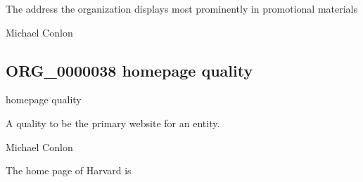 \documentclass[letterpaper,10pt,english]{sphinxmanual}
\begin{document}
\begin{sphinxShadowBox}

\sphinxAtStartPar
The address the organization displays most prominently in promotional materials
\end{sphinxShadowBox}

\begin{sphinxShadowBox}

\sphinxAtStartPar
Michael Conlon 
\end{sphinxShadowBox}
\begin{quote}

\ignorespaces \end{quote}


\subsection{ORG\_0000038 \sphinxhyphen{} homepage quality}
\label{\detokenize{doc-ORG_0000038:org-0000038-homepage-quality}}\label{\detokenize{doc-ORG_0000038:index-0}}\label{\detokenize{doc-ORG_0000038::doc}}
\begin{sphinxShadowBox}

\sphinxAtStartPar
homepage quality
\end{sphinxShadowBox}

\begin{sphinxShadowBox}

\sphinxAtStartPar
A quality to be the primary website for an entity.
\end{sphinxShadowBox}

\begin{sphinxShadowBox}

\sphinxAtStartPar
Michael Conlon 
\end{sphinxShadowBox}

\begin{sphinxShadowBox}

\sphinxAtStartPar
The home page of Harvard is 
\end{sphinxShadowBox}
\end{document}
